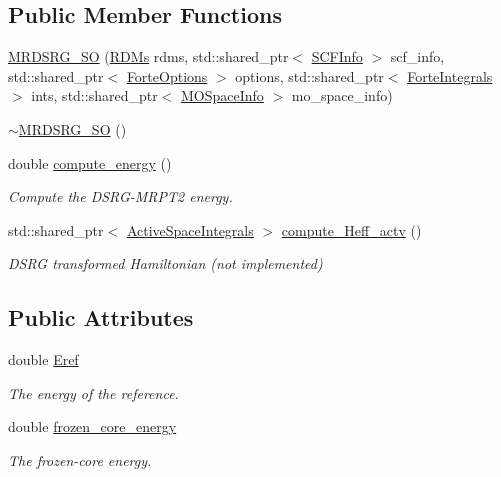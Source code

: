 \subsection*{Public Member Functions}
\begin{DoxyCompactItemize}
\item 
\mbox{\hyperlink{classforte_1_1_m_r_d_s_r_g___s_o_a7423c018162ac2584b0fc4cc693d930c}{M\+R\+D\+S\+R\+G\+\_\+\+SO}} (\mbox{\hyperlink{classforte_1_1_r_d_ms}{R\+D\+Ms}} rdms, std\+::shared\+\_\+ptr$<$ \mbox{\hyperlink{classforte_1_1_s_c_f_info}{S\+C\+F\+Info}} $>$ scf\+\_\+info, std\+::shared\+\_\+ptr$<$ \mbox{\hyperlink{classforte_1_1_forte_options}{Forte\+Options}} $>$ options, std\+::shared\+\_\+ptr$<$ \mbox{\hyperlink{classforte_1_1_forte_integrals}{Forte\+Integrals}} $>$ ints, std\+::shared\+\_\+ptr$<$ \mbox{\hyperlink{classforte_1_1_m_o_space_info}{M\+O\+Space\+Info}} $>$ mo\+\_\+space\+\_\+info)
\item 
\mbox{\hyperlink{classforte_1_1_m_r_d_s_r_g___s_o_ac8e43f3e7d3af3259b8ba62ea5f442d3}{$\sim$\+M\+R\+D\+S\+R\+G\+\_\+\+SO}} ()
\item 
double \mbox{\hyperlink{classforte_1_1_m_r_d_s_r_g___s_o_a5a73a7377c4a2be6ce0d875f9833d589}{compute\+\_\+energy}} ()
\begin{DoxyCompactList}\small\item\em Compute the D\+S\+R\+G-\/\+M\+R\+P\+T2 energy. \end{DoxyCompactList}\item 
std\+::shared\+\_\+ptr$<$ \mbox{\hyperlink{classforte_1_1_active_space_integrals}{Active\+Space\+Integrals}} $>$ \mbox{\hyperlink{classforte_1_1_m_r_d_s_r_g___s_o_a2c927466355d27797fb2a7b5ff478779}{compute\+\_\+\+Heff\+\_\+actv}} ()
\begin{DoxyCompactList}\small\item\em D\+S\+RG transformed Hamiltonian (not implemented) \end{DoxyCompactList}\end{DoxyCompactItemize}
\subsection*{Public Attributes}
\begin{DoxyCompactItemize}
\item 
double \mbox{\hyperlink{classforte_1_1_m_r_d_s_r_g___s_o_a84a09737c84444f1974d285edb172c6b}{Eref}}
\begin{DoxyCompactList}\small\item\em The energy of the reference. \end{DoxyCompactList}\item 
double \mbox{\hyperlink{classforte_1_1_m_r_d_s_r_g___s_o_a413fa1834f9c01dadfc005347f79d716}{frozen\+\_\+core\+\_\+energy}}
\begin{DoxyCompactList}\small\item\em The frozen-\/core energy. \end{DoxyCompactList}\end{DoxyCompactItemize}
